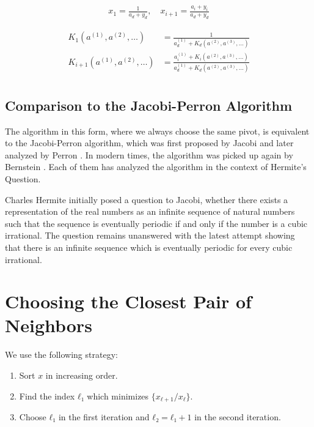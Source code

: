 \documentclass[english,version-2020-11]{uzl-thesis}
\begin{document}
\begin{align*}
  x_1 = \frac{1}{a_d + y_d},
  \quad x_{i+1} = \frac{a_i + y_i}{a_d + y_d}
\end{align*}

\begin{align*}
  K_1(a^{(1)}, a^{(2)}, \dots) & = \frac{1}{a^{(1)}_d + K_d(a^{(2)}, a^{(3)}, \dots)} \\
  K_{i+1}(a^{(1)}, a^{(2)}, \dots) & =
    \frac{a^{(1)}_i + K_i(a^{(2)}, a^{(3)}, \dots)}
         {a^{(1)}_d + K_d(a^{(2)}, a^{(3)}, \dots)} \\
\end{align*}

\section{Comparison to the Jacobi-Perron Algorithm}

The algorithm in this form, where we always choose the same pivot,
is equivalent to the Jacobi-Perron algorithm, which was first proposed
by Jacobi \cite{Jacobi68} and later analyzed by Perron \cite{Perron07}.
In modern times, the algorithm was picked up again by Bernstein \cite{Bernstein06}.
Each of them has analyzed the algorithm in the context of Hermite's Question.

Charles Hermite initially posed a question to Jacobi, whether there exists a
representation of the real numbers as an infinite sequence of natural numbers
such that the sequence is eventually periodic if and only if the number is a
cubic irrational. The question remains unanswered with the latest attempt
\cite{Murru15} showing that there is an infinite sequence which is eventually
periodic for every cubic irrational.


\chapter{Choosing the Closest Pair of Neighbors}


We use the following strategy:

\begin{enumerate}
  \item Sort $x$ in increasing order.
  \item Find the index $ℓ₁$ which minimizes $\{x_{ℓ+1}/x_ℓ\}$.
  \item Choose $ℓ₁$ in the first iteration and $ℓ₂ = ℓ₁ + 1$ in the second iteration.
\end{enumerate}
\end{document}

